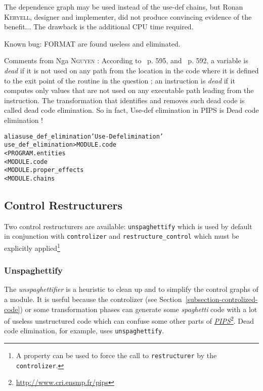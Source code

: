 \documentclass[a4paper]{report}
\newenvironment{PipsMake}{\begin{alltt}}{\end{alltt}}
\newcommand{\LINK}[2]{\href{#2}{#1}\footnote{\url{#2}}\xspace}
\newcommand{\PIPS}{\LINK{\emph{PIPS}}{http://www.cri.ensmp.fr/pips}}
\begin{document}
The dependence graph may be used instead of the use-def chains, but
Ronan \textsc{Keryell}, designer and implementer, did not produce convincing
evidence of the benefit... The drawback is the additional CPU time
required.

Known bug: FORMAT are found useless and eliminated.

Comments from Nga \textsc{Nguyen} : According to~\cite{Aho86} p. 595,  and~\cite{Much97} p. 592, a
variable is {\it dead} if it is not used on any path from the location in
the code where it is defined to the exit point of the routine in the
question ; an instruction is {\it dead} if it computes only values that
are not used on any executable path leading from the instruction. The
transformation that identifies and removes such dead code is called dead
code elimination. So in fact, Use-def elimination in PIPS is Dead code
elimination !


\begin{PipsMake}
alias use_def_elimination 'Use-Def elimination'
use_def_elimination          > MODULE.code
        < PROGRAM.entities
        < MODULE.code
        < MODULE.proper_effects
        < MODULE.chains
\end{PipsMake}

\subsection{Control Restructurers}

Two control restructurers are available: \verb/unspaghettify/ which is
used by default in conjunction with \verb/controlizer/ and
\verb/restructure_control/ which must be explicitly applied\footnote{A property
  can be used to force the call to \texttt{restructurer} by the
  \texttt{controlizer}.}


\subsubsection{Unspaghettify}
\label{sec:unspaghettify}

The \emph{unspaghettifier} is a heuristic to clean up and to simplify
the control graphs of a module. It
is useful because the controlizer (see
Section~\ref{subsection-controlized-code}) or some transformation phases
can generate some {\em spaghetti} code with a lot of useless
unstructured code which can confuse some other parts of \PIPS{}. Dead code
elimination, for example, uses \texttt{unspaghettify}.
\end{document}
